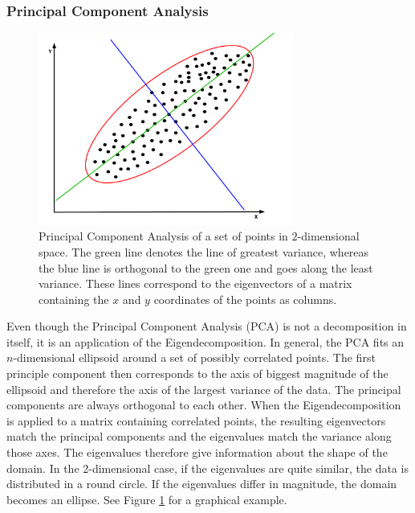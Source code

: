 \subsubsection{Principal Component Analysis}

\begin{figure}[t]
  \centering
  \includegraphics[width=0.75\textwidth]{Images/PCA.pdf}
  \caption{Principal Component Analysis of a set of points in
  $2$-dimensional space. The green line denotes the line of greatest
  variance, whereas the blue line is orthogonal to the green one and
  goes along the least variance. These lines correspond to the
  eigenvectors of a matrix containing the $x$ and $y$ coordinates of the
  points as columns.}
  \label{fig:PCA}
\end{figure}

Even though the Principal Component Analysis (PCA) is not a decomposition
in itself, it is an application of the Eigendecomposition. In general,
the PCA fits an $n$-dimensional ellipsoid around a set of possibly
correlated points. The first principle component then corresponds to the
axis of biggest magnitude of the ellipsoid and therefore the axis of the
largest variance of the data. The principal components are always
orthogonal to each other. When the Eigendecomposition is applied to a
matrix containing correlated points, the resulting eigenvectors match
the principal components and the eigenvalues match the variance along
those axes. The eigenvalues therefore give information about the shape
of the domain. In the 2-dimensional case, if the eigenvalues are quite
similar, the data is distributed in a round circle. If the eigenvalues
differ in magnitude, the domain becomes an ellipse. See Figure
\ref{fig:PCA} for a graphical example.

